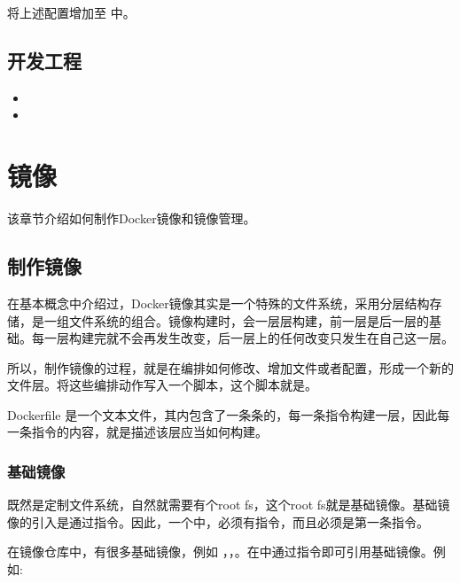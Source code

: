 \documentclass[letterpaper,10pt,english]{sphinxmanual}
\begin{document}
将上述配置增加至  中。


\subsection{开发工程}
\label{\detokenize{docker/practice:id5}}\begin{itemize}
\item {} 

\item {} 

\end{itemize}


\section{镜像}
\label{\detokenize{docker/practice:id6}}
该章节介绍如何制作Docker镜像和镜像管理。


\subsection{制作镜像}
\label{\detokenize{docker/practice:id7}}
在基本概念中介绍过，Docker镜像其实是一个特殊的文件系统，采用分层结构存储，是一组文件系统的组合。镜像构建时，会一层层构建，前一层是后一层的基础。每一层构建完就不会再发生改变，后一层上的任何改变只发生在自己这一层。

所以，制作镜像的过程，就是在编排如何修改、增加文件或者配置，形成一个新的文件层。将这些编排动作写入一个脚本，这个脚本就是。

Dockerfile 是一个文本文件，其内包含了一条条的，每一条指令构建一层，因此每一条指令的内容，就是描述该层应当如何构建。


\subsubsection{基础镜像}
\label{\detokenize{docker/practice:id8}}
既然是定制文件系统，自然就需要有个root fs，这个root fs就是基础镜像。基础镜像的引入是通过指令。因此，一个中，必须有指令，而且必须是第一条指令。

在镜像仓库中，有很多基础镜像，例如  ，，。在中通过指令即可引用基础镜像。例如:
\end{document}
